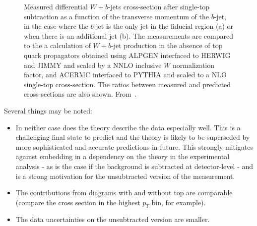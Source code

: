 \documentclass[floatfix]{article}
\begin{document}
\begin{figure}%
\centering
{}
\caption{\label{fig:notop}
Measured differential $W+b$-jets cross-section after single-top subtraction as a function of the transverse momentum of the $b$-jet, in the case where the $b$-jet is the only jet in the fiducial region (a) or when there is an additional jet (b). 
The measurements are compared to the a calculation of $W+b$-jet production in the absence of top quark propagators obtained using ALPGEN interfaced to HERWIG and JIMMY and scaled by a NNLO inclusive $W$ normalization factor, and ACERMC interfaced to PYTHIA and scaled to a NLO single-top cross-section. 
The ratios between measured and predicted cross-sections are also shown. From~\protect\cite{Aad:2013vka}.}
\end{figure}

Several things may be noted:
\begin{itemize}
\item In neither case does the theory describe the data especially well. This is a challenging
final state to predict and the theory is likely to be superseded by more sophisticated and 
accurate predictions in future. This strongly mitigates against embedding in a dependency 
on the theory in the experimental analysis - as is the case if the background is subtracted at detector-level - 
and is a strong motivation for the unsubtracted version of the measurement.
\item The contributions from diagrams with and without top are comparable (compare the cross section in the highest $p_T$ bin, 
for example).
\item The data uncertainties on the unsubtracted version are smaller.
\end{itemize}
\end{document}
